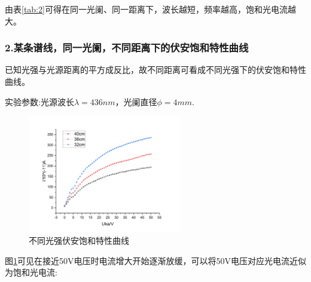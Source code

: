 \documentclass[12pt,a4paper,UTF8]{ctexart}
\begin{document}
\begin{table}[htbp]
	\centering
	\caption{不同波长光源抬头点数据}
	\vspace{0.7em}
\label{tab:2}%
\end{table}

由表\ref{tab:2}可得在同一光阑、同一距离下，波长越短，频率越高，饱和光电流越大。

\subsubsection*{2.某条谱线，同一光阑，不同距离下的伏安饱和特性曲线}
已知光强与光源距离的平方成反比，故不同距离可看成不同光强下的伏安饱和特性曲线。

实验参数:光源波长$\lambda=436nm$，光阑直径$\phi=4mm$.

\begin{figure}[!h]
	\centering
	\includegraphics[width=0.6\textwidth]{img//d.png}
	\caption{不同光强伏安饱和特性曲线}
	\label{fig:d}
\end{figure}

图\ref{fig:d}可见在接近50V电压时电流增大开始逐渐放缓，可以将50V电压对应光电流近似为饱和光电流:
\begin{table}[htbp]
	\centering
	\caption{不同光强饱和电流值}
	\vspace{0.7em}
\label{tab:3}%
\end{table}
\end{document}
